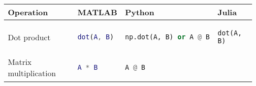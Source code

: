 \begin{tabular}[]{@{}llll@{}}
\toprule
\begin{minipage}[b]{0.23\columnwidth}\raggedright
Operation
\end{minipage} & \begin{minipage}[b]{0.22\columnwidth}\raggedright
MATLAB
\end{minipage} & \begin{minipage}[b]{0.23\columnwidth}\raggedright
Python
\end{minipage} & \begin{minipage}[b]{0.20\columnwidth}\raggedright
Julia
\end{minipage}\tabularnewline
\midrule
\begin{minipage}[t]{0.23\columnwidth}\raggedright
Dot product
\end{minipage} & \begin{minipage}[t]{0.22\columnwidth}\raggedright
\begin{lstlisting}[language=Matlab]
dot(A, B)
\end{lstlisting}

\end{minipage} & \begin{minipage}[t]{0.23\columnwidth}\raggedright
\begin{lstlisting}[language=Python]
np.dot(A, B) or A @ B
\end{lstlisting}

\end{minipage} & \begin{minipage}[t]{0.20\columnwidth}\raggedright
\begin{lstlisting}
dot(A, B)
\end{lstlisting}

\end{minipage}\tabularnewline
\begin{minipage}[t]{0.23\columnwidth}\raggedright
Matrix multiplication
\end{minipage} & \begin{minipage}[t]{0.22\columnwidth}\raggedright
\begin{lstlisting}[language=Matlab]
A * B
\end{lstlisting}

\end{minipage} & \begin{minipage}[t]{0.23\columnwidth}\raggedright
\begin{lstlisting}[language=Python]
A @ B
\end{lstlisting}


\end{minipage}
\end{tabular}
